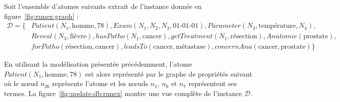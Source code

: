 \begin{example}
    Soit l'ensemble d'atomes suivants extrait de l'instance donnée en figure~\ref{fig:runex:graph} :
    \begin{align*}
        \mathcal{D} = \{ & Patient(N_1, \text{homme}, 78), Exam(N_1, N_2, N_3, \text{01-01-01}), Parameter(N_3, \text{température}, N_4), \\
                        & Reveal(N_3, \text{fièvre}), hasPatho(N_1, \text{cancer}), getTreatment(N_1, \text{résection}), Anatomie(\text{prostate}), \\
                        & forPatho(\text{résection}, \text{cancer}), leadsTo(\text{cancer}, \text{métastase}), concernAna(\text{cancer}, \text{prostate}) \}
    \end{align*}

    En utilisant la modélisation présentée précédemment, l'atome $Patient(N_1, \text{homme}, 78)$ est alors représenté par le graphe de propriétés suivant où le nœud $n_{26}$ représente l'atome et les nœuds $n_1$, $n_6$ et $n_7$ représentent ses termes.
    La figure~\ref{fig:update:db:runex} montre une vue complète de l'instance $\mathcal{D}$.

    \begin{center}
    \end{center}
\end{example}

